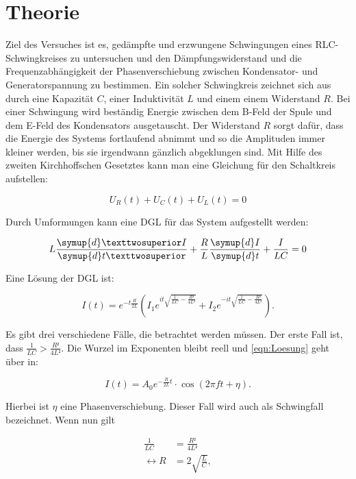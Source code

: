\section{Theorie}
\label{sec:Theorie}

Ziel des Versuches ist es, gedämpfte und erzwungene Schwingungen eines
RLC-Schwingkreises zu untersuchen und den Dämpfungswiderstand und die 
Frequenzabhängigkeit der Phasenverschiebung zwischen Kondensator- und 
Generatorspannung zu bestimmen. 
Ein solcher Schwingkreis zeichnet sich aus durch eine Kapazität $C$, 
einer Induktivität $L$ und einem einem Widerstand $R$. Bei einer 
Schwingung wird beständig Energie zwischen dem B-Feld der Spule und
dem E-Feld des Kondensators ausgetauscht. Der Widerstand $R$ sorgt
dafür, dass die Energie des Systems fortlaufend abnimmt und so die 
Amplituden immer kleiner werden, bis sie irgendwann gänzlich abgeklungen 
sind. 
Mit Hilfe des zweiten Kirchhoffschen Gesetztes kann man eine Gleichung 
für den Schaltkreis aufstellen: 

\begin{equation*}
U_R(t) + U_C(t) + U_L(t) = 0 
\end{equation*}

Durch Umformungen kann eine DGL für das System aufgestellt werden: 

\begin{equation}
L\frac{\symup{d}²I}{\symup{d}t²}+\frac{R}{L} \frac{\symup{d}I}{\symup{d}t}+\frac{I}{LC} = 0
\end{equation}

Eine Lösung der DGL ist: 

\begin{equation}
I(t) = e^{-t\frac{R}{2L}}\left(I_1 e^{it\sqrt{\frac{1}{LC}-\frac{R²}{4L²}}}+I_2 e^{-it\sqrt{\frac{1}{LC}-\frac{R²}{4L²}}} \right).
\label{eqn:Loesung}
\end{equation}

Es gibt drei verschiedene Fälle, die betrachtet werden müssen. 
Der erste Fall ist, dass $\frac{1}{LC} > \frac{R²}{4L²}$. Die Wurzel im Exponenten
bleibt reell und \eqref{eqn:Loesung} geht über in: 

\begin{equation*}
I(t) = A_0 e^{-\frac{R}{2L}t}\cdot \cos\left({2\pi ft+\eta}\right).
\end{equation*}

Hierbei ist $\eta$ eine Phasenverschiebung. Dieser Fall wird auch als 
Schwingfall bezeichnet. 
Wenn nun gilt

\begin{align*}
\frac{1}{LC} &= \frac{R²}{4L²}\\
\leftrightarrow R &= 2\sqrt{\frac{L}{C}},
\end{align*}

